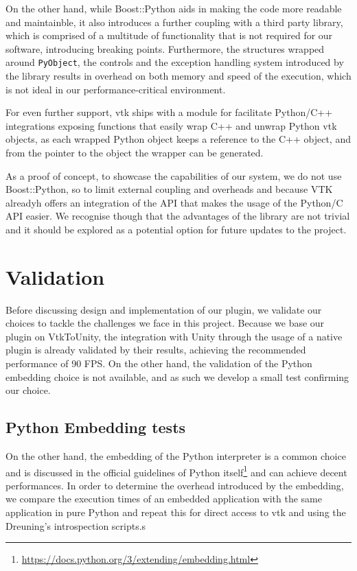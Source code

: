 On the other hand, while Boost::Python aids in making the code more readable and maintainble, it also introduces a further coupling with a third party library, which is comprised of a multitude of functionality that is not required for our software, introducing breaking points. Furthermore, the structures wrapped around \verb|PyObject|, the controls and the exception handling system introduced by the library results in overhead on both memory and speed of the execution, which is not ideal in our performance-critical environment. 

For even further support, \acrshort{vtk} ships with a module for facilitate Python/C++ integrations exposing functions that easily wrap C++ and unwrap Python \acrshort{vtk} objects, as each wrapped Python object keeps a reference to the C++ object, and from the pointer to the object the wrapper can be generated.

As a proof of concept, to showcase the capabilities of our system, we do not use Boost::Python, so to limit external coupling and overheads and because VTK alreadyh offers an integration of the API that makes the usage of the Python/C API easier. We recognise though that the advantages of the library are not trivial and it should be explored as a potential option for future updates to the project.

\section{Validation}

Before discussing design and implementation of our plugin, we validate our choices to tackle the challenges we face in this project. Because we base our plugin on VtkToUnity, the integration with Unity through the usage of a native plugin is already validated by their results, achieving the recommended performance of 90 FPS. On the other hand, the validation of the Python embedding choice is not available, and as such we develop a small test confirming our choice.

\subsection{Python Embedding tests}

On the other hand, the embedding of the Python interpreter is a common choice and is discussed in the official guidelines of Python itself\footnote{\url{https://docs.python.org/3/extending/embedding.html}} and can achieve decent performances. In order to determine the overhead introduced by the embedding, we compare the execution times of an embedded application with the same application in pure Python and repeat this for direct access to \acrshort{vtk} and using the Dreuning's introspection scripts.s

